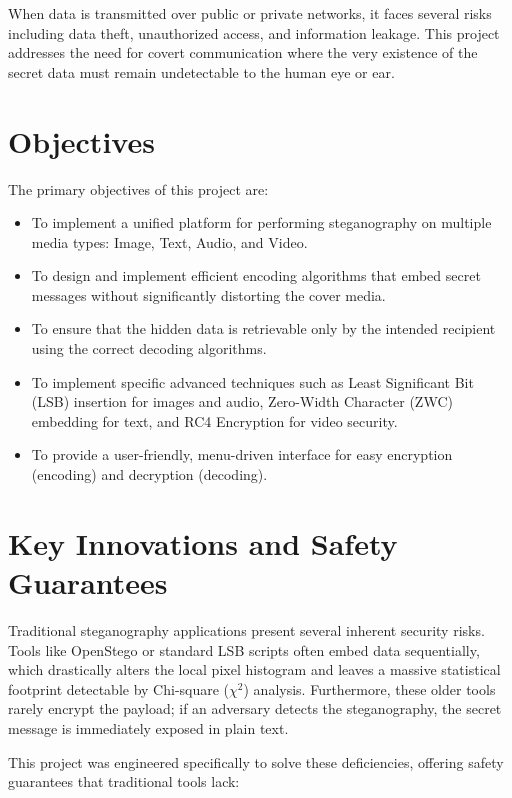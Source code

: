 \documentclass[12pt,a4paper]{report}
\begin{document}
When data is transmitted over public or private networks, it faces several risks including data theft, unauthorized access, and information leakage. This project addresses the need for covert communication where the very existence of the secret data must remain undetectable to the human eye or ear.

\section{Objectives}
The primary objectives of this project are:
\begin{itemize}
    \item To implement a unified platform for performing steganography on multiple media types: Image, Text, Audio, and Video.
    \item To design and implement efficient encoding algorithms that embed secret messages without significantly distorting the cover media.
    \item To ensure that the hidden data is retrievable only by the intended recipient using the correct decoding algorithms.
    \item To implement specific advanced techniques such as Least Significant Bit (LSB) insertion for images and audio, Zero-Width Character (ZWC) embedding for text, and RC4 Encryption for video security.
    \item To provide a user-friendly, menu-driven interface for easy encryption (encoding) and decryption (decoding).
\end{itemize}

\section{Key Innovations and Safety Guarantees}
Traditional steganography applications present several inherent security risks. Tools like OpenStego or standard LSB scripts often embed data sequentially, which drastically alters the local pixel histogram and leaves a massive statistical footprint detectable by Chi-square ($\chi^2$) analysis. Furthermore, these older tools rarely encrypt the payload; if an adversary detects the steganography, the secret message is immediately exposed in plain text.

This project was engineered specifically to solve these deficiencies, offering safety guarantees that traditional tools lack:
\end{document}
